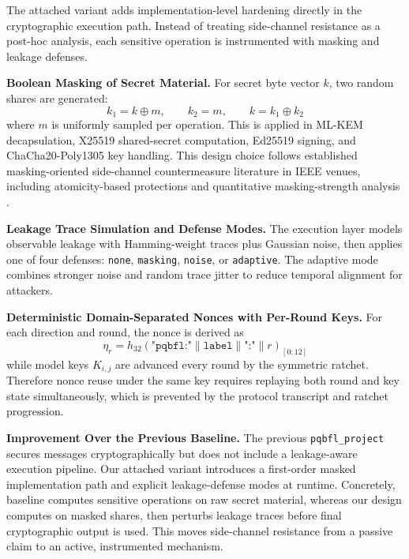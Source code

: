 \documentclass[journal, 10pt, twocolumn]{IEEEtran}
\begin{document}
\label{sec:contribution_hardening}

The attached variant adds implementation-level hardening directly in the cryptographic execution path. Instead of treating side-channel resistance as a post-hoc analysis, each sensitive operation is instrumented with masking and leakage defenses.

\textbf{Boolean Masking of Secret Material.} For secret byte vector $k$, two random shares are generated:
\begin{equation}
k_1 = k \oplus m, \qquad k_2 = m, \qquad k = k_1 \oplus k_2
\label{eq:boolean_masking}
\end{equation}
where $m$ is uniformly sampled per operation. This is applied in ML-KEM decapsulation, X25519 shared-secret computation, Ed25519 signing, and ChaCha20-Poly1305 key handling.
This design choice follows established masking-oriented side-channel countermeasure literature in IEEE venues, including atomicity-based protections and quantitative masking-strength analysis \cite{ieee_atomicity2004, ieee_qmask2015, ieee_fpl_masking2010}.

\textbf{Leakage Trace Simulation and Defense Modes.} The execution layer models observable leakage with Hamming-weight traces plus Gaussian noise, then applies one of four defenses: \texttt{none}, \texttt{masking}, \texttt{noise}, or \texttt{adaptive}. The adaptive mode combines stronger noise and random trace jitter to reduce temporal alignment for attackers.

\textbf{Deterministic Domain-Separated Nonces with Per-Round Keys.} For each direction and round, the nonce is derived as
\begin{equation}
\eta_r = h_{32}(\texttt{"pqbfl:"} \| \texttt{label} \| \texttt{":"} \| r)_{[0:12]}
\label{eq:nonce_derivation_attached}
\end{equation}
while model keys $K_{i,j}$ are advanced every round by the symmetric ratchet. Therefore nonce reuse under the same key requires replaying both round and key state simultaneously, which is prevented by the protocol transcript and ratchet progression.

\textbf{Improvement Over the Previous Baseline.} The previous \texttt{pqbfl\_project} secures messages cryptographically but does not include a leakage-aware execution pipeline. Our attached variant introduces a first-order masked implementation path and explicit leakage-defense modes at runtime. Concretely, baseline computes sensitive operations on raw secret material, whereas our design computes on masked shares, then perturbs leakage traces before final cryptographic output is used. This moves side-channel resistance from a passive claim to an active, instrumented mechanism.
\end{document}
